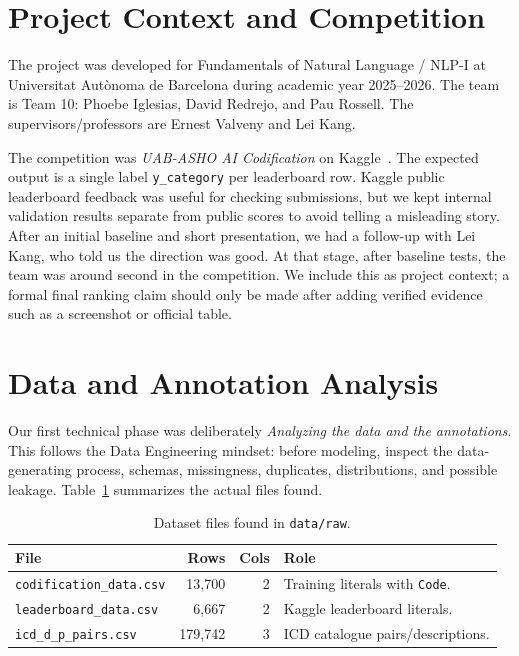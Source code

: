 \documentclass[10pt,a4paper,twocolumn]{article}
\newcommand{\course}{Fundamentals of Natural Language / NLP-I}
\newcommand{\team}{Team 10}
\begin{document}
\section{Project Context and Competition}

The project was developed for \course{} at Universitat Autònoma de Barcelona during academic year 2025--2026. The team is \team: Phoebe Iglesias, David Redrejo, and Pau Rossell. The supervisors/professors are Ernest Valveny and Lei Kang.

The competition was \emph{UAB-ASHO AI Codification} on Kaggle~\cite{kaggleuabasho}. The expected output is a single label \texttt{y\_category} per leaderboard row. Kaggle public leaderboard feedback was useful for checking submissions, but we kept internal validation results separate from public scores to avoid telling a misleading story. After an initial baseline and short presentation, we had a follow-up with Lei Kang, who told us the direction was good. At that stage, after baseline tests, the team was around second in the competition. We include this as project context; a formal final ranking claim should only be made after adding verified evidence such as a screenshot or official table.

\section{Data and Annotation Analysis}

Our first technical phase was deliberately \emph{Analyzing the data and the annotations}. This follows the Data Engineering mindset: before modeling, inspect the data-generating process, schemas, missingness, duplicates, distributions, and possible leakage. Table~\ref{tab:data} summarizes the actual files found.

\begin{table}[h]
\centering
\caption{Dataset files found in \texttt{data/raw}.}
\label{tab:data}
\begin{tabularx}{\columnwidth}{lrrX}
\toprule
File & Rows & Cols & Role \\
\midrule
\texttt{codification\_data.csv} & 13,700 & 2 & Training literals with \texttt{Code}. \\
\texttt{leaderboard\_data.csv} & 6,667 & 2 & Kaggle leaderboard literals. \\
\texttt{icd\_d\_p\_pairs.csv} & 179,742 & 3 & ICD catalogue pairs/descriptions. \\
\bottomrule
\end{tabularx}
\end{table}
\end{document}
